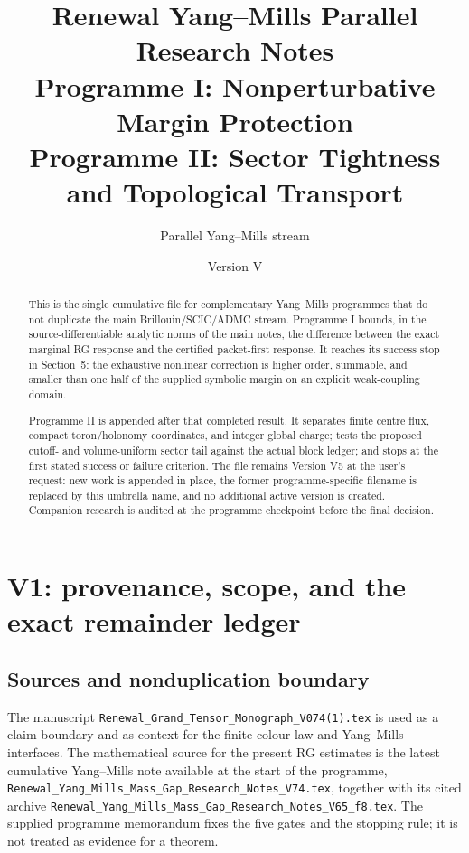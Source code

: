 \documentclass[11pt]{article}
\title{Renewal Yang--Mills Parallel Research Notes\\
Programme I: Nonperturbative Margin Protection\\
Programme II: Sector Tightness and Topological Transport}
\author{Parallel Yang--Mills stream}
\date{Version V\currentversion}
\theoremstyle{definition}
\theoremstyle{remark}
\begin{document}
\maketitle

\begin{abstract}
This is the single cumulative file for complementary Yang--Mills programmes
that do not duplicate the main Brillouin/SCIC/ADMC stream.  Programme I bounds,
in the source-differentiable analytic norms of the main notes, the difference
between the exact marginal RG response and the certified packet-first response.
It reaches its success stop in Section~5: the exhaustive nonlinear correction
is higher order, summable, and smaller than one half of the supplied symbolic
margin on an explicit weak-coupling domain.

Programme II is appended after that completed result.  It separates finite
centre flux, compact toron/holonomy coordinates, and integer global charge;
tests the proposed cutoff- and volume-uniform sector tail against the actual
block ledger; and stops at the first stated success or failure criterion.  The
file remains Version V5 at the user's request: new work is appended in place,
the former programme-specific filename is replaced by this umbrella name, and
no additional active version is created.  Companion research is audited at
the programme checkpoint before the final decision.
\end{abstract}

\tableofcontents

\section{V1: provenance, scope, and the exact remainder ledger}

\subsection{Sources and nonduplication boundary}

The manuscript
\texttt{Renewal\_Grand\_Tensor\_Monograph\_V074(1).tex} is used as a claim
boundary and as context for the finite colour-law and Yang--Mills interfaces.
The mathematical source for the present RG estimates is the latest cumulative
Yang--Mills note available at the start of the programme,
\texttt{Renewal\_Yang\_Mills\_Mass\_Gap\_Research\_Notes\_V74.tex}, together
with its cited archive
\texttt{Renewal\_Yang\_Mills\_Mass\_Gap\_Research\_Notes\_V65\_f8.tex}.
The supplied programme memorandum fixes the five gates and the stopping rule;
it is not treated as evidence for a theorem.
\end{document}
